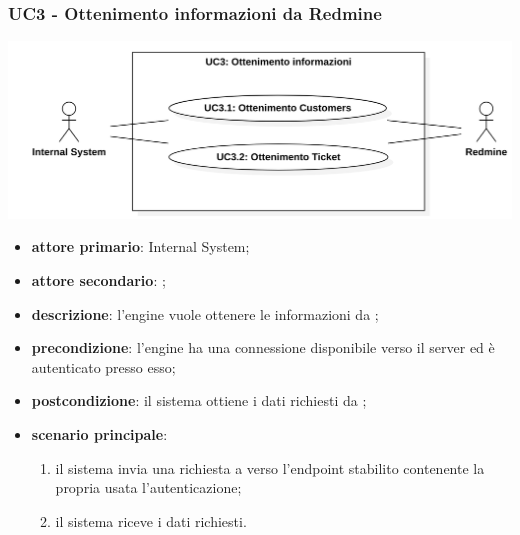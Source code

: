 \subsubsection{UC3 - Ottenimento informazioni da Redmine}
\begin{center}
	\includegraphics[keepaspectratio = true, width=15cm]{immagini/uc/2.png}
\end{center}
\begin{itemize}
	\item \textbf{attore primario}: Internal System;
	\item \textbf{attore secondario}: ;
	\item \textbf{descrizione}: l'engine vuole ottenere le informazioni da ;
	\item \textbf{precondizione}: l'engine ha una connessione disponibile verso il server  ed è autenticato presso esso;
	\item \textbf{postcondizione}: il sistema ottiene i dati richiesti da ;
	\item \textbf{scenario principale}: 
	\begin{enumerate}
		\item il sistema invia una richiesta a  verso l'endpoint stabilito contenente la propria  usata l'autenticazione;
		\item il sistema riceve i dati richiesti.
	\end{enumerate}
\end{itemize}
